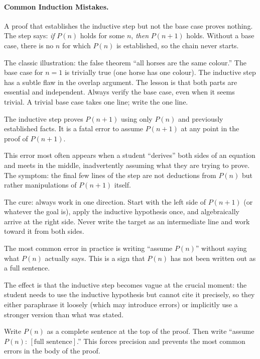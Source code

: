 \paragraph{Common Induction Mistakes.}

\begin{remark}
A proof that establishes the inductive step but not the base case proves
nothing. The step says: \emph{if} $P(n)$ holds for some $n$, \emph{then}
$P(n+1)$ holds. Without a base case, there is no $n$ for which $P(n)$
is established, so the chain never starts.

The classic illustration: the false theorem ``all horses are the same
colour.'' The base case for $n = 1$ is trivially true (one horse has
one colour). The inductive step has a subtle flaw in the overlap argument.
The lesson is that both parts are essential and independent. Always
verify the base case, even when it seems trivial. A trivial base case
takes one line; write the one line.
\end{remark}

\begin{remark}
The inductive step proves $P(n+1)$ using only $P(n)$ and previously
established facts. It is a fatal error to assume $P(n+1)$ at any point
in the proof of $P(n+1)$.

This error most often appears when a student ``derives'' both sides of
an equation and meets in the middle, inadvertently assuming what they
are trying to prove. The symptom: the final few lines of the step are
not deductions from $P(n)$ but rather manipulations of $P(n+1)$ itself.

The cure: always work in one direction. Start with the left side of
$P(n+1)$ (or whatever the goal is), apply the inductive hypothesis once,
and algebraically arrive at the right side. Never write the target as
an intermediate line and work toward it from both sides.
\end{remark}

\begin{remark}
The most common error in practice is writing ``assume $P(n)$'' without
saying what $P(n)$ actually says. This is a sign that $P(n)$ has not
been written out as a full sentence.

The effect is that the inductive step becomes vague at the crucial
moment: the student needs to use the inductive hypothesis but cannot
cite it precisely, so they either paraphrase it loosely (which may
introduce errors) or implicitly use a stronger version than what was
stated.

Write $P(n)$ as a complete sentence at the top of the proof. Then
write ``assume $P(n)$: $[\text{full sentence}]$.'' This forces precision
and prevents the most common errors in the body of the proof.
\end{remark}

